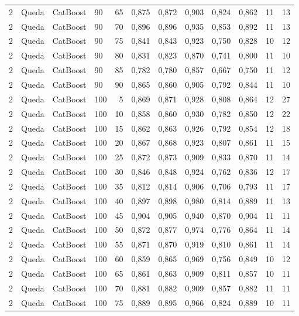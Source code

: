 \begin{longtable}{ccclrrrrrrrr}
2 & Queda & CatBoost & 90 & 65 & 0,875 & 0,872 & 0,903 & 0,824 & 0,862 & 11 & 13 \\
2 & Queda & CatBoost & 90 & 70 & 0,896 & 0,896 & 0,935 & 0,853 & 0,892 & 11 & 13 \\
2 & Queda & CatBoost & 90 & 75 & 0,841 & 0,843 & 0,923 & 0,750 & 0,828 & 10 & 12 \\
2 & Queda & CatBoost & 90 & 80 & 0,831 & 0,823 & 0,870 & 0,741 & 0,800 & 11 & 10 \\
2 & Queda & CatBoost & 90 & 85 & 0,782 & 0,780 & 0,857 & 0,667 & 0,750 & 11 & 12 \\
2 & Queda & CatBoost & 90 & 90 & 0,865 & 0,860 & 0,905 & 0,792 & 0,844 & 11 & 10 \\
2 & Queda & CatBoost & 100 & 5 & 0,869 & 0,871 & 0,928 & 0,808 & 0,864 & 12 & 27 \\
2 & Queda & CatBoost & 100 & 10 & 0,858 & 0,860 & 0,930 & 0,782 & 0,850 & 12 & 22 \\
2 & Queda & CatBoost & 100 & 15 & 0,862 & 0,863 & 0,926 & 0,792 & 0,854 & 12 & 18 \\
2 & Queda & CatBoost & 100 & 20 & 0,867 & 0,868 & 0,923 & 0,807 & 0,861 & 11 & 15 \\
2 & Queda & CatBoost & 100 & 25 & 0,872 & 0,873 & 0,909 & 0,833 & 0,870 & 11 & 14 \\
2 & Queda & CatBoost & 100 & 30 & 0,846 & 0,848 & 0,924 & 0,762 & 0,836 & 12 & 17 \\
2 & Queda & CatBoost & 100 & 35 & 0,812 & 0,814 & 0,906 & 0,706 & 0,793 & 11 & 17 \\
2 & Queda & CatBoost & 100 & 40 & 0,897 & 0,898 & 0,980 & 0,814 & 0,889 & 11 & 13 \\
2 & Queda & CatBoost & 100 & 45 & 0,904 & 0,905 & 0,940 & 0,870 & 0,904 & 11 & 11 \\
2 & Queda & CatBoost & 100 & 50 & 0,872 & 0,877 & 0,974 & 0,776 & 0,864 & 11 & 14 \\
2 & Queda & CatBoost & 100 & 55 & 0,871 & 0,870 & 0,919 & 0,810 & 0,861 & 11 & 14 \\
2 & Queda & CatBoost & 100 & 60 & 0,859 & 0,865 & 0,969 & 0,756 & 0,849 & 10 & 12 \\
2 & Queda & CatBoost & 100 & 65 & 0,861 & 0,863 & 0,909 & 0,811 & 0,857 & 10 & 11 \\
2 & Queda & CatBoost & 100 & 70 & 0,881 & 0,882 & 0,909 & 0,857 & 0,882 & 11 & 11 \\
2 & Queda & CatBoost & 100 & 75 & 0,889 & 0,895 & 0,966 & 0,824 & 0,889 & 10 & 11 \\

\end{longtable}

